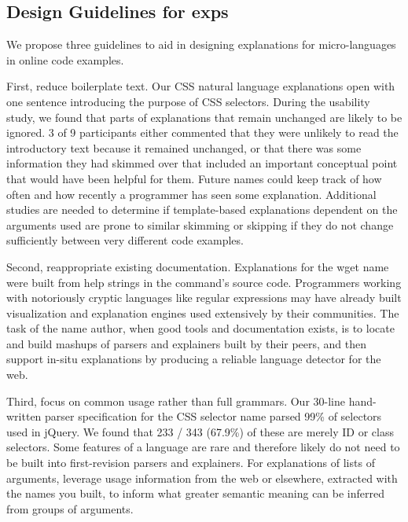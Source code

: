 \begin{changes}
\subsection{Design Guidelines for \Glspl{exp}}
We propose three guidelines to aid in designing explanations for micro-languages in online code examples.

First, reduce boilerplate text.
Our CSS natural language explanations open with one sentence introducing the purpose of CSS selectors.
During the usability study, we found that parts of explanations that remain unchanged are likely to be ignored.
3 of 9 participants either commented that they were unlikely to read the introductory text because it remained unchanged, or that there was some information they had skimmed over that included an important conceptual point that would have been helpful for them.
Future \glspl{name} could keep track of how often and how recently a programmer has seen some explanation.
Additional studies are needed to determine if template-based explanations dependent on the arguments used are prone to similar skimming or skipping if they do not change sufficiently between very different code examples.

Second, reappropriate existing documentation.
Explanations for the wget \gls{name} were built from help strings in the command's source code.
Programmers working with notoriously cryptic languages like regular expressions may have already built visualization and explanation engines used extensively by their communities.
The task of the \gls{name} author, when good tools and documentation exists, is to locate and build mashups of parsers and explainers built by their peers, and then support in-situ explanations by producing a reliable language detector for the web.

Third, focus on common usage rather than full grammars.
Our 30-line hand-written parser specification for the CSS selector \gls{name} parsed 99\% of selectors used in jQuery.
We found that 233 / 343 (67.9\%) of these are merely ID or class selectors.
Some features of a language are rare and therefore likely do not need to be built into first-revision parsers and explainers.
For explanations of lists of arguments, leverage usage information from the web or elsewhere, extracted with the \glspl{name} you built, to inform what greater semantic meaning can be inferred from groups of arguments.

\end{changes}
